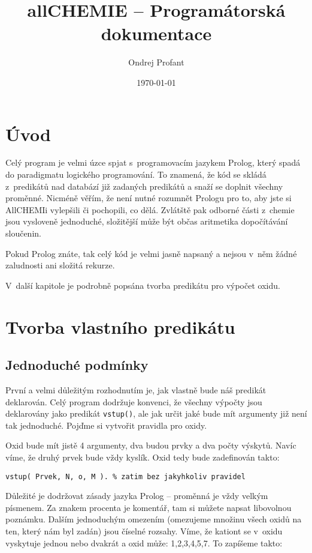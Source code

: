 \documentclass[a4paper]{article}
\title{allCHEMIE -- Programátorská dokumentace}
\author{Ondrej Profant}
\date{\today}
\begin{document}
\maketitle
\newpage
\tableofcontents
\newpage
\section{Úvod}
Celý program je velmi úzce spjat s~programovacím jazykem Prolog, který spadá do paradigmatu logického programování.
To znamená, že kód se skládá z~predikátů nad databází již zadaných predikátů a snaží se doplnit všechny proměnné. 
Nicméně věřím, že není nutné rozumnět Prologu pro to, aby jste si AllCHEMIi vylepšili či pochopili, co dělá.
Zvlátště pak odborné části z~chemie jsou vysloveně jednoduché, složitější může být občas aritmetika dopočítávání sloučenin. 

Pokud Prolog znáte, tak celý kód je velmi jasně napsaný a nejsou v~něm žádné zaludnosti ani složitá rekurze.

V~další kapitole je podrobně popsána tvorba predikátu pro výpočet oxidu.
\section{Tvorba vlastního predikátu} 
\subsection{Jednoduché podmínky}
První a velmi důležitým rozhodnutím je, jak vlastně bude náš predikát deklarován. 
Celý program dodržuje konvenci, že všechny výpočty jsou deklarovány jako predikát \texttt{vstup()}, ale
jak určit jaké bude mít argumenty již není tak jednoduché. Pojďme si vytvořit pravidla pro oxidy.

Oxid bude mít jistě 4 argumenty, dva budou prvky a dva počty výskytů. Navíc víme, že druhý prvek bude vždy
kyslík. Oxid tedy bude zadefinován takto:

\begin{verbatim}
vstup( Prvek, N, o, M ). % zatim bez jakyhkoliv pravidel
\end{verbatim}

Důležité je dodržovat zásady jazyka Prolog -- proměnná je vždy velkým písmenem. Za znakem procenta je komentář, tam
si můžete napsat libovolnou poznámku. Dalším jednoduchým omezením (omezujeme množinu všech oxidů na ten, který nám byl zadán)
jsou číselné rozsahy. Víme, že kationt se v~oxidu vyskytuje jednou nebo dvakrát a oxid může: 1,2,3,4,5,7. 
To zapíšeme takto:
\end{document}
